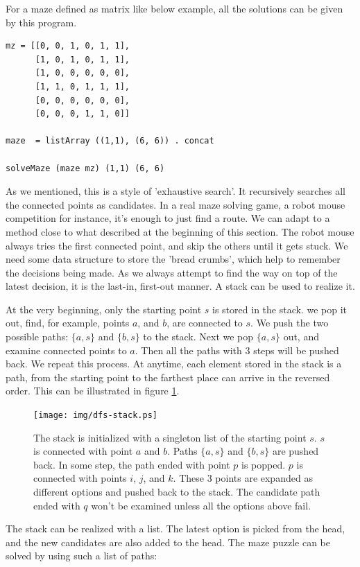 \documentclass[UTF8]{article}
\begin{document}
For a maze defined as matrix like below example, all the solutions can be given
by this program.

\lstset{language=Haskell}
\begin{lstlisting}
mz = [[0, 0, 1, 0, 1, 1],
      [1, 0, 1, 0, 1, 1],
      [1, 0, 0, 0, 0, 0],
      [1, 1, 0, 1, 1, 1],
      [0, 0, 0, 0, 0, 0],
      [0, 0, 0, 1, 1, 0]]

maze  = listArray ((1,1), (6, 6)) . concat

solveMaze (maze mz) (1,1) (6, 6)
\end{lstlisting}

As we mentioned, this is a style of 'exhaustive search'. It recursively searches all the connected
points as candidates. In a real maze solving game, a robot mouse competition for instance,
it's enough to just find a route. We can adapt to a method close to what described at the
beginning of this section. The robot mouse always tries the first connected point, and skip
the others until it gets stuck. We need some data structure to
store the 'bread crumbs', which help to remember the decisions being made. As we always attempt
to find the way on top of the latest decision, it is the last-in, first-out manner.
A stack can be used to realize it.

At the very beginning, only the starting point $s$ is stored in the stack. we pop it out,
find, for example, points $a$, and $b$, are connected to $s$. We push the two possible
paths: $\{a, s\}$ and $\{b, s\}$ to the stack. Next we pop $\{a, s\}$ out, and examine
connected points to $a$. Then all the paths with 3 steps will be pushed back. We
repeat this process. At anytime, each element stored in the stack is a path, from the
starting point to the farthest place can arrive in the reversed order.
This can be illustrated in figure \ref{fig:dfs-stack}.

\begin{figure}[htbp]
 \centering
 \texttt{[image: img/dfs-stack.ps]}
 \caption{The stack is initialized with a singleton list of the starting point $s$. $s$ is connected with point $a$ and $b$. Paths $\{a, s\}$ and $\{b, s\}$ are pushed back. In some step, the path ended with point $p$ is popped.
$p$ is connected with points $i$, $j$, and $k$. These 3 points are expanded as different options and pushed
back to the stack. The candidate path ended with $q$ won't be examined unless all the options above fail.}
 \label{fig:dfs-stack}
\end{figure}

The stack can be realized with a list. The latest option is picked from the head, and the new
candidates are also added to the head.
The maze puzzle can be solved by using such a list of paths:
\end{document}
